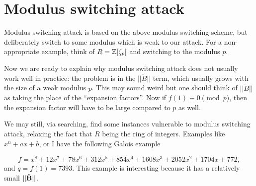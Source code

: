 \documentclass{amsart}
\begin{document}
\section{Modulus switching attack}

Modulus switching attack is based on the above modulus switching scheme, but deliberately switch to some modulus which is weak to our attack. For a non-appropriate example, think of $R = \mathbb{Z}[\zeta_p]$ and switching to the modulus $p$.

Now we are ready to explain why modulus switching attack
does not usually work well in practice: the problem is in the $||\tilde{B}||$ term, which usually grows with the size of a weak modulus $p$. This may sound weird but one should think of $||\tilde{B}||$ as taking the place of the ``expansion factors''. Now if $f(1) \equiv 0 \pmod{p}$, then the expansion factor will have to be large compared to $p$ as well.

We may still, via searching, find some instances vulnerable to modulus switching attack, relaxing the
fact that $R$ being the ring of integers. Examples like
$x^n + ax+ b$, or I have the following Galois example

$$f = x^8 + 12x^7 + 78x^6 + 312x^5 + 854x^4 + 1608x^3 + 2052x^2 + 1704x+ 772,$$ and $q = f(1) = 7393$. This example is interesting because it has a relatively small
$||\tilde{{\bf B}}||$. 
\end{document}
